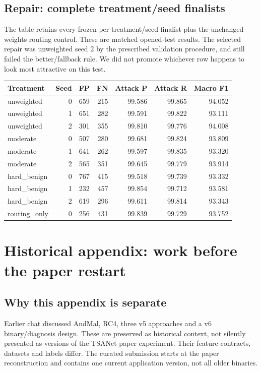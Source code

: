 \documentclass[11pt,a4paper,oneside]{report}
\begin{document}
\section{Repair: complete treatment/seed finalists}
The table retains every frozen per-treatment/seed finalist plus the unchanged-weights routing control. These are matched opened-test results. The selected repair was unweighted seed 2 by the prescribed validation procedure, and still failed the better/fallback rule. We did not promote whichever row happens to look most attractive on this test.

{\small
\begin{longtable}{@{}lrrrrrr@{}}
\toprule
Treatment & Seed & FP & FN & Attack P & Attack R & Macro F1\\\midrule\endhead
unweighted & 0 & 659 & 215 & 99.586 & 99.865 & 94.052\\
unweighted & 1 & 651 & 282 & 99.591 & 99.822 & 93.111\\
unweighted & 2 & 301 & 355 & 99.810 & 99.776 & 94.008\\
moderate & 0 & 507 & 280 & 99.681 & 99.824 & 93.809\\
moderate & 1 & 641 & 262 & 99.597 & 99.835 & 93.320\\
moderate & 2 & 565 & 351 & 99.645 & 99.779 & 93.914\\
hard\_benign & 0 & 767 & 415 & 99.518 & 99.739 & 93.332\\
hard\_benign & 1 & 232 & 457 & 99.854 & 99.712 & 93.581\\
hard\_benign & 2 & 619 & 296 & 99.611 & 99.814 & 93.343\\
routing\_only & 0 & 256 & 431 & 99.839 & 99.729 & 93.752\\
\bottomrule\end{longtable}
}


\chapter{Historical appendix: work before the paper restart}
\section{Why this appendix is separate}
Earlier chat discussed AndMal, RC4, three v5 approaches and a v6 binary/diagnosis design. These are preserved as historical context, not silently presented as versions of the TSANet paper experiment. Their feature contracts, datasets and labels differ. The curated submission starts at the paper reconstruction and contains one current application version, not all older binaries.
\end{document}
